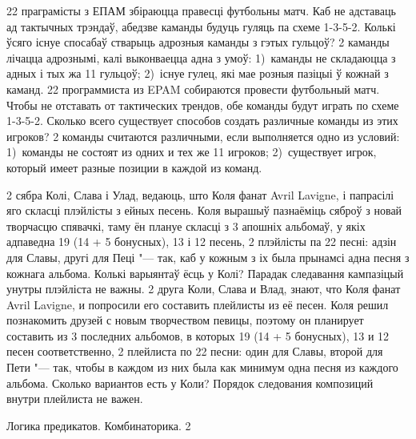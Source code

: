 \documentclass[11pt,twoside]{article}
\begin{document}
\begin{problemList}
\bigskip

\problemItemSimple
{22 праграмісты з ЕПАМ збіраюцца правесці футбольны матч.
Каб не адставаць ад тактычных трэндаў, абедзве каманды будуць гуляць па схеме 1-3-5-2.
Колькі ўсяго існуе спосабаў стварыць адрозныя каманды з гэтых гульцоў?
2 каманды лічацца адрознымі, калі выконваецца адна з умоў:
1)~каманды не складаюцца з адных і тых жа 11 гульцоў;
2)~існуе гулец, які мае розныя пазіцыі ў кожнай з каманд.}
{22 программиста из EPAM собираются провести футбольный матч.
Чтобы не отставать от тактических трендов, обе команды будут играть по схеме 1-3-5-2.
Сколько всего существует способов создать различные команды из этих игроков?
2 команды считаются различными, если выполняется одно из условий:
1)~команды не состоят из одних и тех же 11 игроков;
2)~существует игрок, который имеет разные позиции в каждой из команд.}

\bigskip

\problemItemSimple
{2 сябра Колі, Слава і Улад, ведаюць, што Коля фанат Avril Lavigne, і папрасілі яго скласці плэйлісты з ейных песень.
Коля вырашыў пазнаёміць сяброў з новай творчасцю спявачкі, таму ён плануе скласці з 3 апошніх альбомаў,
у якіх адпаведна 19 (14 + 5 бонусных), 13 і 12 песень, 2 плэйлісты па 22 песні: адзін для Славы, другі для Пеці "--- так,
каб у кожным з іх была прынамсі адна песня з кожнага альбома.
Колькі варыянтаў ёсць у Колі? Парадак следавання кампазіцый унутры плэйліста не важны.}
{2 друга Коли, Слава и Влад, знают, что Коля фанат Avril Lavigne, и попросили его составить плейлисты из её песен.
Коля решил познакомить друзей с новым творчеством певицы, поэтому он планирует составить из 3 последних альбомов,
в которых 19 (14 + 5 бонусных), 13 и 12 песен соответственно, 2 плейлиста по 22 песни: один для Славы, второй для Пети "--- так,
чтобы в каждом из них была как минимум одна песня из каждого альбома.
Сколько вариантов есть у Коли? Порядок следования композиций внутри плейлиста не важен.}

\end{problemList}
    
\newpage 

{Логика предикатов. Комбинаторика.}
{2}
\end{document}
